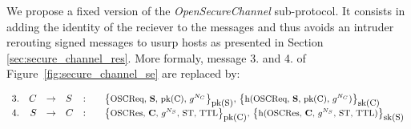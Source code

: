 We propose a fixed version of the {\em OpenSecureChannel} sub-protocol.
It consists in adding the identity of the reciever to the messages and thus 
avoids an intruder rerouting signed messages to usurp hosts as presented
in Section \ref{sec:secure_channel_res}.
More formaly, message 3. and 4. of Figure~\ref{fig:secure_channel_se} are replaced
by:

\arraycolsep=1.4pt
\begin{flushleft}
    \[\begin{array}{lrllll}
        3. & C & \rightarrow & S & : & \text{\small\sm{\oscreq, {\bf S}, pk(C), $g^{N_{C}}$}{pk(S)}{sk(C)}}\\
        4. & S & \rightarrow & C & : & \text{\small\sm{\oscres, {\bf C}, $g^{N_{S}}$, ST, TTL}{pk(C)}{sk(S)}}\\
    \end{array}\]
\end{flushleft}

%
%
%
%                
%                
%
%
%
%
%
%

